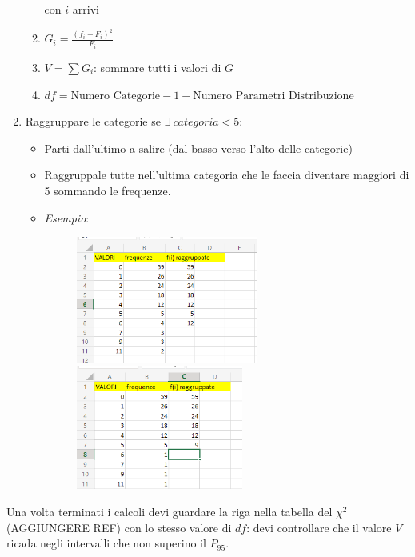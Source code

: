 \begin{enumerate}
\begin{enumerate}
                        con $i$ arrivi
                  \item $G_i = \frac{(f_i - F_i)^2}{F_i}$
                  \item $V = \sum G_i$: sommare tutti i valori di $G$
                  \item $df = \text{Numero Categorie} - 1 - \text{Numero
                                    Parametri Distribuzione}$
            \end{enumerate}
      \item Raggruppare le categorie se $\exists \ categoria < 5$:
            \begin{itemize}
                  \item Parti dall'ultimo a salire (dal basso verso l'alto delle
                        categorie)
                  \item Raggruppale tutte nell'ultima categoria che le faccia
                        diventare maggiori di 5 sommando le frequenze.
                  \item \textit{Esempio}:
                        \begin{figure}[H]
                              \centering
                              \includegraphics[width=6cm, keepaspectratio]{capitoli/goodnes_of_fit/imgs/vesceragay.png}
                              \includegraphics[width=5.5cm, keepaspectratio]{capitoli/goodnes_of_fit/imgs/POSTAMOLTOGAY.png}
                        \end{figure}
            \end{itemize}
\end{enumerate}

Una volta terminati i calcoli devi guardare la riga nella tabella del $\chi^2$
(AGGIUNGERE REF) con lo stesso valore di $df$: devi controllare che il valore
$V$ ricada negli intervalli che non superino il $P_{95}$.